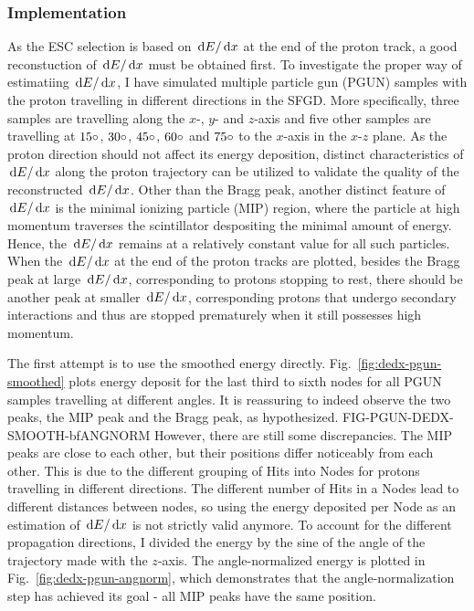    \subsubsection{Implementation}
   As the ESC selection is based on $\,\textrm{d}E/\,\textrm{d}x$ at the end of the proton track, a good reconstuction of $\,\textrm{d}E/\,\textrm{d}x$ must be obtained first.
   To investigate the proper way of estimatiing $\,\textrm{d}E/\,\textrm{d}x$, I have simulated multiple particle gun (PGUN) samples with the proton travelling in different directions in the SFGD.
   More specifically, three samples are travelling along the $x$-, $y$- and $z$-axis and five other samples are travelling at $15\circ$, $30\circ$, $45\circ$, $60\circ$ and $75\circ$ to the $x$-axis in the $x$-$z$ plane.
   As the proton direction should not affect its energy deposition, distinct characteristics of $\,\textrm{d}E/\,\textrm{d}x$ along the proton trajectory can be utilized to validate the quality of the reconstructed $\,\textrm{d}E/\,\textrm{d}x$.
   Other than the Bragg peak, another distinct feature of $\,\textrm{d}E/\,\textrm{d}x$ is the minimal ionizing particle (MIP) region, where the particle at high momentum traverses the scintillator despositing the minimal amount of energy. 
   Hence, the $\,\textrm{d}E/\,\textrm{d}x$ remains at a relatively constant value for all such particles.
   When the $\,\textrm{d}E/\,\textrm{d}x$ at the end of the proton tracks are plotted, besides the Bragg peak at large $\,\textrm{d}E/\,\textrm{d}x$, corresponding to protons stopping to rest, there should be another peak at smaller $\,\textrm{d}E/\,\textrm{d}x$, corresponding protons that undergo secondary interactions and thus are stopped prematurely when it still possesses high momentum.

   The first attempt is to use the smoothed energy directly. 
   Fig.~\ref{fig:dedx-pgun-smoothed} plots energy deposit for the last third to sixth nodes for all PGUN samples travelling at different angles.
   It is reassuring to indeed observe the two peaks, the MIP peak and the Bragg peak, as hypothesized. 
   FIG-PGUN-DEDX-SMOOTH-bfANGNORM
   However, there are still some discrepancies. 
   The MIP peaks are close to each other, but their positions differ noticeably from each other.
   This is due to the different grouping of Hits into Nodes for protons travelling in different directions.
   The different number of Hits in a Nodes lead to different distances between nodes, so using the energy deposited per Node as an estimation of $\,\textrm{d}E/\,\textrm{d}x$ is not strictly valid anymore.
   To account for the different propagation directions, I divided the energy by the sine of the angle of the trajectory made with the $z$-axis.
   The angle-normalized energy is plotted in Fig.~\ref{fig:dedx-pgun-angnorm}, which demonstrates that the angle-normalization step has achieved its goal - all MIP peaks have the same position.

